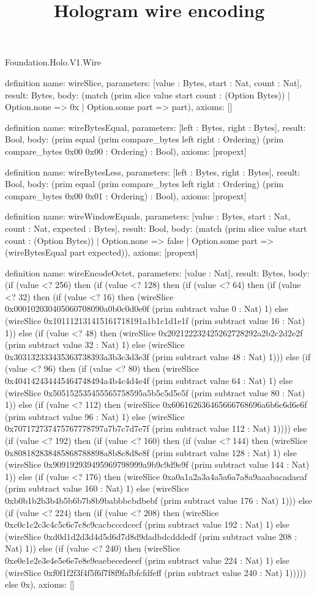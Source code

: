 \begin{lexlean}{Foundation.Holo.V1.Wire}
\title{Hologram wire encoding}
\begin{semanticmodule}
definition{
  name: wireSlice,
  parameters: [value : Bytes, start : Nat, count : Nat],
  result: Bytes,
  body: (match (prim slice value start count : (Option Bytes))
    | Option.none => 0x
    | Option.some part => part),
  axioms: []
}

definition{
  name: wireBytesEqual,
  parameters: [left : Bytes, right : Bytes],
  result: Bool,
  body: (prim equal (prim compare_bytes left right : Ordering) (prim compare_bytes 0x00 0x00 : Ordering) : Bool),
  axioms: [propext]
}

definition{
  name: wireBytesLess,
  parameters: [left : Bytes, right : Bytes],
  result: Bool,
  body: (prim equal (prim compare_bytes left right : Ordering) (prim compare_bytes 0x00 0x01 : Ordering) : Bool),
  axioms: [propext]
}

definition{
  name: wireWindowEquals,
  parameters: [value : Bytes, start : Nat, count : Nat, expected : Bytes],
  result: Bool,
  body: (match (prim slice value start count : (Option Bytes))
    | Option.none => false
    | Option.some part => (wireBytesEqual part expected)),
  axioms: [propext]
}

definition{
  name: wireEncodeOctet,
  parameters: [value : Nat],
  result: Bytes,
  body: (if (value <? 256) then (if (value <? 128) then (if (value <? 64) then (if (value <? 32) then (if (value <? 16) then (wireSlice 0x000102030405060708090a0b0c0d0e0f (prim subtract value 0 : Nat) 1) else (wireSlice 0x101112131415161718191a1b1c1d1e1f (prim subtract value 16 : Nat) 1)) else (if (value <? 48) then (wireSlice 0x202122232425262728292a2b2c2d2e2f (prim subtract value 32 : Nat) 1) else (wireSlice 0x303132333435363738393a3b3c3d3e3f (prim subtract value 48 : Nat) 1))) else (if (value <? 96) then (if (value <? 80) then (wireSlice 0x404142434445464748494a4b4c4d4e4f (prim subtract value 64 : Nat) 1) else (wireSlice 0x505152535455565758595a5b5c5d5e5f (prim subtract value 80 : Nat) 1)) else (if (value <? 112) then (wireSlice 0x606162636465666768696a6b6c6d6e6f (prim subtract value 96 : Nat) 1) else (wireSlice 0x707172737475767778797a7b7c7d7e7f (prim subtract value 112 : Nat) 1)))) else (if (value <? 192) then (if (value <? 160) then (if (value <? 144) then (wireSlice 0x808182838485868788898a8b8c8d8e8f (prim subtract value 128 : Nat) 1) else (wireSlice 0x909192939495969798999a9b9c9d9e9f (prim subtract value 144 : Nat) 1)) else (if (value <? 176) then (wireSlice 0xa0a1a2a3a4a5a6a7a8a9aaabacadaeaf (prim subtract value 160 : Nat) 1) else (wireSlice 0xb0b1b2b3b4b5b6b7b8b9babbbcbdbebf (prim subtract value 176 : Nat) 1))) else (if (value <? 224) then (if (value <? 208) then (wireSlice 0xc0c1c2c3c4c5c6c7c8c9cacbcccdcecf (prim subtract value 192 : Nat) 1) else (wireSlice 0xd0d1d2d3d4d5d6d7d8d9dadbdcdddedf (prim subtract value 208 : Nat) 1)) else (if (value <? 240) then (wireSlice 0xe0e1e2e3e4e5e6e7e8e9eaebecedeeef (prim subtract value 224 : Nat) 1) else (wireSlice 0xf0f1f2f3f4f5f6f7f8f9fafbfcfdfeff (prim subtract value 240 : Nat) 1))))) else 0x),
  axioms: []
}


\end{semanticmodule}
\end{lexlean}

